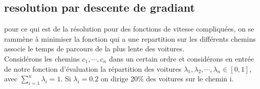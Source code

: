 \documentclass{article}
\begin{document}
\newpage
\subsection{resolution par descente de gradiant}
pour ce qui est de la r\'esolution pour des fonctions de vitesse compliqu\'ees, on se ramm\`ene \`a minimiser la fonction qui a une repartition sur les diff\'erents chemins associe le temps de parcours de la plus lente des voitures.\\
Consid\'erons les chemins $c_1,\cdots,c_n$ dans un certain ordre et consid\'erons en entr\'ee de notre fonction d'\'evaluation la r\'epartition des voitures $\lambda_1,\lambda_2,\cdots,\lambda_n \in [0,1]$, avec $\sum_{i=1}^n \lambda_i = 1$. Si $\lambda_i=0.2$ on dirige 20\% des voitures sur le chemin i. 
\end{document}
